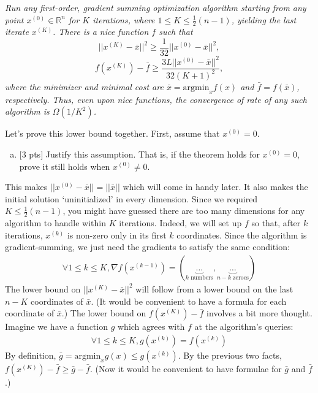 \documentclass[12pt]{article}
\begin{document}
\emph{Run any first-order, gradient summing optimization algorithm starting from any point $x^{(0)} \in \mathbb{R}^n$ for $K$ iterations, where $1 \leq K \leq \frac{1}{2}(n-1)$, yielding the last iterate $x^{(K)}$. There is a nice function $f$ such that 
$$||x^{(K)} - \bar{x}||^2 \geq \frac{1}{32} ||x^{(0)} - \bar{x}||^2,$$
$$f(x^{(K)}) - \bar{f} \geq \frac{3L||x^{(0)} - \bar{x}||^2}{32(K+1)^2},$$ 
where the minimizer and minimal cost are $\bar{x} = \textrm{argmin}_x f(x)$ and $\bar{f} = f(\bar{x})$, respectively. Thus, even upon nice functions, the convergence of rate of any such algorithm is $\Omega(1/K^2)$.}

Let's prove this lower bound together. First, assume that $x^{(0)} = 0$.
\begin{enumerate}[(a)]
\item $[$3 pts$]$ Justify this assumption. That is, if the theorem holds for $x^{(0)} = 0$, prove it still holds when $x^{(0)} \neq 0$. 
\end{enumerate}

This makes $||x^{(0)} - \bar{x}|| = ||\bar{x}||$ which will come in handy later. It also makes the initial solution `uninitialized' in every dimension. Since we required $K \leq \frac{1}{2}(n-1)$, you might have guessed there are too many dimensions for any algorithm to handle within $K$ iterations. Indeed, we will set up $f$ so that, after $k$ iterations, $x^{(k)}$ is non-zero only in its first $k$ coordinates. Since the algorithm is gradient-summing, we just need the gradients to satisfy the same condition:
\begin{align}
\forall 1 \leq k \leq K, \nabla f(x^{(k-1)}) = (\underbrace{\ldots}_{k\textrm{ numbers}}, \underbrace{\ldots}_{n-k\textrm{ zeroes}}) \label{gradzeros}
\end{align}
The lower bound on $||x^{(K)} - \bar{x}||^2$ will follow from a lower bound on the last $n-K$ coordinates of $\bar{x}$. (It would be convenient to have a formula for each coordinate of $\bar{x}$.)
The lower bound on $f(x^{(K)}) - \bar{f}$ involves a bit more thought. Imagine we have a function $g$ which agrees with $f$ at the algorithm's queries:
\begin{align}
\forall 1 \leq k \leq K, g(x^{(k)}) = f(x^{(k)}) \label{agree}
\end{align}
By definition, $\bar{g} = \textrm{argmin}_x g(x) \leq g(x^{(k)})$. By the previous two facts, 
$f(x^{(K)}) - \bar{f} \geq \bar{g} - \bar{f}$. (Now it would be convenient to have formulae for $\bar{g}$ and $\bar{f}$.) 
\end{document}
